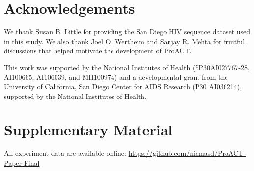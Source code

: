 \documentclass[oupdraft]{sysbio}
\begin{document}


\section{Acknowledgements}
We thank Susan B. Little for providing the San Diego HIV sequence dataset used in this study.
We also thank Joel O. Wertheim and Sanjay R. Mehta for fruitful discussions that helped motivate the development of ProACT.

This work was supported by the National Institutes of Health (5P30AI027767-28, AI100665, AI106039, and MH100974) and a developmental grant from the University of California, San Diego Center for AIDS Research (P30 AI036214), supported by the National Institutes of Health.

\section{Supplementary Material}
All experiment data are available online: \url{https://github.com/niemasd/ProACT-Paper-Final}

\bigskip\bigskip




\end{document}
